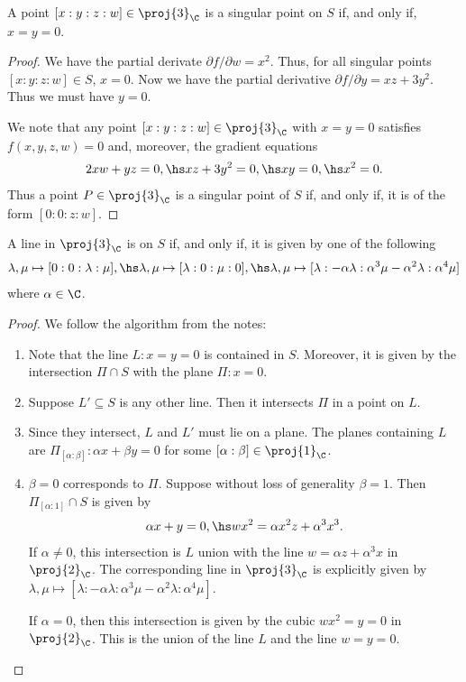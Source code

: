 \documentclass{article}
\begin{document}
\begin{claim*}[1b]
  A point $[x:y:z:w]\in\proj{3}_{\C}$ is a singular point on $S$ if, and only if, $x=y=0$.
  \begin{proof}
    We have the partial derivate $\partial f/\partial w = x^2$. Thus, for all singular
    points $[x:y:z:w]\in S$, $x=0$. Now we have the partial derivative
    $\partial f/\partial y=xz+3y^2$. Thus we must have $y=0$.

    We note that any point $[x:y:z:w]\in\proj{3}_{\C}$ with $x=y=0$ satisfies $f(x,y,z,w)=0$ and,
    moreover, the gradient equations
    \begin{align*}
      2 xw + yz = 0,\hs
      xz + 3y^2 = 0,\hs
      xy = 0,\hs
      x^2 = 0.
    \end{align*}
    Thus a point $P\in\proj{3}_{\C}$ is a singular point of $S$ if, and only if,
    it is of the form $[0 : 0 : z : w]$.
  \end{proof}
\end{claim*}

\begin{claim*}[2]
  A line in $\proj{3}_{\C}$ is on $S$ if, and only if, it is given by one of the following
  \begin{align*}
    \lambda,\mu \mapsto [ 0 : 0 : \lambda : \mu ],\hs
    \lambda,\mu \mapsto [ \lambda : 0 : \mu : 0 ],\hs
    \lambda,\mu \mapsto [ \lambda : -\alpha\lambda : \alpha^3 \mu - \alpha^2\lambda :\alpha^4\mu]
  \end{align*}
  where $\alpha\in\C$.
  \begin{proof}
    We follow the algorithm from the notes:
    \begin{enumerate}
      \item Note that the line $L:x=y=0$ is contained in $S$. Moreover, it is given by the
        intersection $\Pi\cap S$ with the plane $\Pi:x = 0$.
      \item Suppose $L'\subseteq S$ is any other line. Then it intersects $\Pi$ in a point
        on $L$.
      \item Since they intersect, $L$ and $L'$ must lie on a plane. The planes containing
        $L$ are $\Pi_{[\alpha:\beta]}:\alpha x + \beta y = 0$ for some $[\alpha:\beta]\in\proj{1}_{\C}$.
      \item $\beta=0$ corresponds to $\Pi$. Suppose without loss of generality $\beta=1$. Then
        $\Pi_{[\alpha:1]}\cap S$ is given by
        \begin{align*}
          \alpha x + y = 0, \hs wx^2 = \alpha x^2 z + \alpha^3 x^3.
        \end{align*}
        If $\alpha\neq 0$, this intersection is $L$ union with the line
        $w = \alpha z + \alpha^3 x$ in $\proj{2}_{\C}$. The corresponding line in $\proj{3}_{\C}$ is explicitly
        given by $\lambda,\mu \mapsto [\lambda : -\alpha\lambda : \alpha^3\mu - \alpha^2\lambda : \alpha^4\mu]$.

        If $\alpha=0$, then this intersection is given by the cubic $wx^2 = y = 0$ in $\proj{2}_{\C}$.
        This is the union of the line $L$ and the line $w=y=0$.
    \end{enumerate}
  \end{proof}
\end{claim*}
\end{document}
